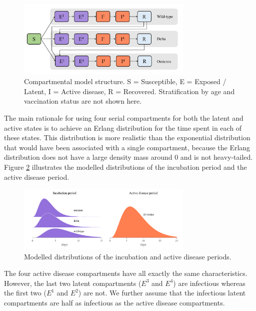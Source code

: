 \begin{figure}[ht]
    \begin{center}
    \includegraphics[width=0.75\textwidth]{../../tex_descriptions/models/sm_covid/sm_covid_se4i4r.pdf}
    \end{center}
    \caption{Compartmental model structure. 
    S = Susceptible, E = Exposed / Latent, I = Active disease, R = Recovered.
    Stratification by age and vaccination status are not shown here.
    } 
    \label{fig:se4i4r}
\end{figure}

The main rationale for using four serial compartments for both the latent and active states is to achieve an Erlang distribution for the time spent in each of these states. This distribution is more realistic than
the exponential distribution that would have been associated with a single compartment, because the Erlang distribution does not have a large density mass around 0 and is not heavy-tailed. Figure \ref{fig:sojourn} 
illustrates the modelled distributions of the incubation period and the active disease period. 

\begin{figure}[ht]
    \begin{center}
    \includegraphics[width=0.75\textwidth]{../../tex_descriptions/models/sm_covid/sojourns.pdf}
    \end{center}
    \caption{Modelled distributions of the incubation and active disease periods.
    } 
    \label{fig:sojourn}
\end{figure}

The four active disease compartments have all exactly the same characteristics. However, the last two latent compartments ($E^3$ and $E^4$) are infectious whereas the first two ($E^1$ and $E^2$) are not. We further assume that 
the infectious latent compartments are half as infectious as the active disease compartments.

